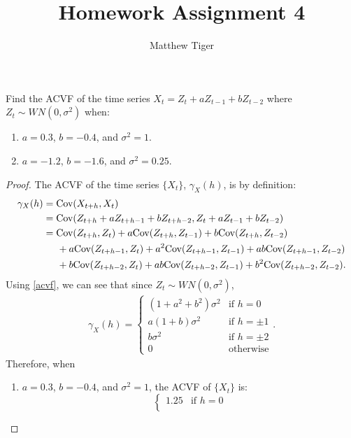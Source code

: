 \documentclass[12pt]{article}
\title{Homework Assignment 4}
\author{Matthew Tiger}
\theoremstyle{definition}
\newenvironment{custompbm}[1]
  {\renewcommand\theproblem{#1}\problem}
  {\endproblem}
\newcommand{\Co}[2]{\text{Cov}({#1}, {#2})}
\begin{document}
\maketitle


\begin{custompbm}{2.3}
  Find the ACVF of the time series $X_t = Z_t + aZ_{t-1} + bZ_{t-2}$ where
  $Z_t \sim WN(0, \sigma^2)$ when:
  \begin{enumerate}
    \item $a=0.3$, $b=-0.4$, and $\sigma^2=1$.
    \item $a=-1.2$, $b=-1.6$, and $\sigma^2=0.25$.
  \end{enumerate}
\end{custompbm}

\begin{proof}
  The ACVF of the time series $\{X_t\}$, $\gamma_X(h)$, is by definition:
  \begin{align}\label{acvf}
    \gamma_X(h)
    &= \Co{X_{t+h}}{X_t} \notag \\
    &= \Co{Z_{t+h} + aZ_{t+h-1} + bZ_{t+h-2}}{Z_{t} + aZ_{t-1} + bZ_{t-2}} \notag \\
    &= \Co{Z_{t+h}}{Z_t} + a\Co{Z_{t+h}}{Z_{t-1}} + b\Co{Z_{t+h}}{Z_{t-2}} \notag \\
    & \hspace{5mm} + a\Co{Z_{t+h-1}}{Z_t} + a^2\Co{Z_{t+h-1}}{Z_{t-1}} + ab\Co{Z_{t+h-1}}{Z_{t-2}} \notag \\
    & \hspace{5mm} + b\Co{Z_{t+h-2}}{Z_t} + ab\Co{Z_{t+h-2}}{Z_{t-1}} + b^2\Co{Z_{t+h-2}}{Z_{t-2}}.
  \end{align}
  Using \eqref{acvf}, we can see that since $Z_t \sim WN(0, \sigma^2)$,
  \begin{align*}
    \gamma_X(h) =
    \begin{cases}
      (1 + a^2 + b^2)\sigma^2 & \text{if $h=0$}\\
      a(1 + b)\sigma^2 & \text{if $h=\pm1$}\\
      b\sigma^2 & \text{if $h=\pm2$}\\
      0 & \text{otherwise}
    \end{cases}.
  \end{align*}
  Therefore, when
  \begin{enumerate}
    \item $a=0.3$, $b=-0.4$, and $\sigma^2=1$, the ACVF of $\{X_t\}$ is:
      \[
        \begin{cases}
          1.25 & \text{if $h=0$}\\

\end{cases}\]
\end{enumerate}
\end{proof}
\end{document}
